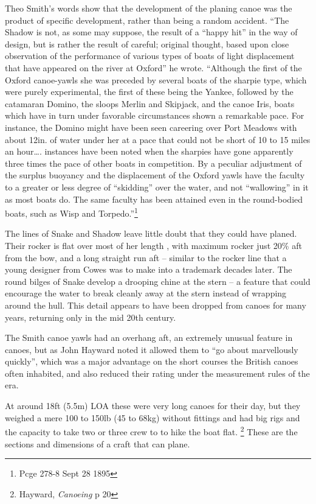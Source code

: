 \documentclass[
  letterpaper,
]{scrbook}
\begin{document}
Theo Smith's words show that the development of the planing canoe was
the product of specific development, rather than being a random
accident. ``The Shadow is not, as some may suppose, the result of a
``happy hit'' in the way of design, but is rather the result of careful;
original thought, based upon close observation of the performance of
various types of boats of light displacement that have appeared on the
river at Oxford'' he wrote. ``Although the first of the Oxford
canoe-yawls she was preceded by several boats of the sharpie type, which
were purely experimental, the first of these being the Yankee, followed
by the catamaran Domino, the sloops Merlin and Skipjack, and the canoe
Iris, boats which have in turn under favorable circumstances shown a
remarkable pace. For instance, the Domino might have been seen careering
over Port Meadows with about 12in. of water under her at a pace that
could not be short of 10 to 15 miles an hour\ldots. instances have been
noted when the sharpies have gone apparently three times the pace of
other boats in competition. By a peculiar adjustment of the surplus
buoyancy and the displacement of the Oxford yawls have the faculty to a
greater or less degree of ``skidding'' over the water, and not
``wallowing'' in it as most boats do. The same faculty has been attained
even in the round-bodied boats, such as Wisp and Torpedo.''\footnote{Pcge
  278-8 Sept 28 1895}

The lines of Snake and Shadow leave little doubt that they could have
planed. Their rocker is flat over most of her length , with maximum
rocker just 20\% aft from the bow, and a long straight run aft --
similar to the rocker line that a young designer from Cowes was to make
into a trademark decades later. The round bilges of Snake develop a
drooping chine at the stern -- a feature that could encourage the water
to break cleanly away at the stern instead of wrapping around the hull.
This detail appears to have been dropped from canoes for many years,
returning only in the mid 20th century.

The Smith canoe yawls had an overhang aft, an extremely unusual feature
in canoes, but as John Hayward noted it allowed them to ``go about
marvellously quickly'', which was a major advantage on the short courses
the British canoes often inhabited, and also reduced their rating under
the measurement rules of the era.

At around 18ft (5.5m) LOA these were very long canoes for their day, but
they weighed a mere 100 to 150lb (45 to 68kg) without fittings and had
big rigs and the capacity to take two or three crew to to hike the boat
flat. \footnote{Hayward, \emph{Canoeing} p 20} These are the sections
and dimensions of a craft that can plane.
\end{document}
